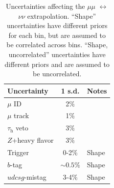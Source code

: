 \begin{table}[!ht]
    \begin{center}
    \caption{Uncertainties affecting the $\mu\mu$ $\leftrightarrow$ $\nu\nu$ extrapolation. ``Shape'' uncertainties have different priors for each bin, but are assumed to be correlated across bins. ``Shape, uncorrelated'' uncertainties have different priors and are assumed to be uncorrelated.}
    \label{tab:mt:zmm_uncs}
    \begin{tabular}{lcl}
        Uncertainty & 1 s.d. & Notes \\ 
        \hline \hline 
        $\mu$ ID  & 2\% & \\ 
        $\mu$ track  & 1\% & \\ 
        $\tau_\mathrm{h}$ veto  & 3\% & \\ 
        $Z$+heavy flavor & 3\% & \\ 
        Trigger & 0-2\% & Shape \\ 
        $b$-tag & $\sim0.5\%$ & Shape \\ 
        $udcsg$-mistag & 3-4\% & Shape \\ 
    \end{tabular}
\end{center}
\end{table}


